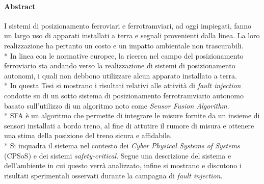 \paragraph{Abstract}
I sistemi di posizionamento ferroviari e ferrotramviari, ad oggi impiegati, fanno un largo uso di apparati installati a terra e segnali provenienti dalla linea. La loro realizzazione ha pertanto un costo e un impatto ambientale non trascurabili.\\*
In linea con le normative europee, la ricerca nel campo del posizionamento ferroviario sta andando verso la realizzazione di sistemi di posizionamento autonomi, i quali non debbono utilizzare alcun apparato installato a terra.\\*
In questa Tesi si mostrano i risultati relativi alle attivit\`a di \emph{fault injection} condotte su di un sotto sistema di posizionamento ferrotramviario autonomo basato sull'utilizzo di un algoritmo noto come \emph{Sensor Fusion Algorithm}.\\*
SFA \`e un algoritmo che permette di integrare le misure fornite da un insieme di sensori installati a bordo treno, al fine di attutire il rumore di misura e ottenere una stima della posizione del treno sicura e affidabile.\\*
Si inquadra il sistema nel contesto dei \emph{Cyber Physical Systems of Systems} (CPSoS) e dei sistemi \emph{safety-critical}. Segue una descrizione del sistema e dell'ambiente in cui questo verr\`a analizzato, infine si mostrano e discutono i risultati sperimentali osservati durante la campagna di \emph{fault injection}.


